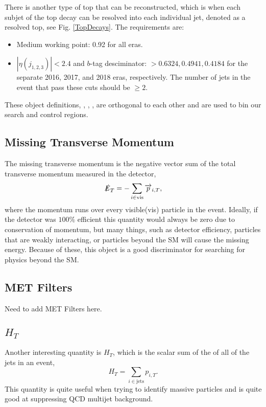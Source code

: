 There is another type of top that can be reconstructed, which is when each subjet of the top decay can be resolved into each individual jet, denoted as a resolved top, see Fig. \ref{TopDecays}. The requirements are:
\begin{itemize}
	\item Medium working point: 0.92 for all eras.
	\item $|\eta(j_{1,2,3})|<2.4$ and $b$-tag desciminator: $>0.6324, 0.4941, 0.4184$ for the separate 2016, 2017, and 2018 eras, respectively. The number of jets in the event that pass these cuts should be $\geq2$.
\end{itemize}
These object definitions, \nt, \nw, \nrt, are orthogonal to each other and are used to bin our search and control regions. 

\subsection{Missing Transverse Momentum}\label{MET}
The missing transverse momentum is the negative vector sum of the total transverse momentum measured in the detector,
\begin{equation}
\slashed{E}_{T}=-\sum_{i\in\text{vis}}\overrightarrow{p}_{i, T},
\end{equation}
where the momentum runs over every visible(vis) particle in the event. Ideally, if the detector was $100\%$ efficient this quantity would always be zero due to conservation of momentum, but many things, such as detector efficiency, particles that are weakly interacting, or particles beyond the SM will cause the missing energy. Because of these, this object is a good discriminator for searching for physics beyond the SM. 

\subsection{MET Filters}
Need to add MET Filters here.

\subsection{$H_T$}\label{HT}
Another interesting quantity is $H_T$, which is the scalar sum of the \pt{} of all of the jets in an event,
\begin{equation}
H_T=\sum_{i\in\text{jets}}p_{i,T}.
\end{equation}
This quantity is quite useful when trying to identify massive particles and is quite good at suppressing QCD multijet background.

